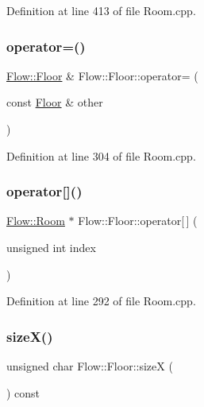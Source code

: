 Definition at line 413 of file Room.\+cpp.

\hypertarget{class_flow_1_1_floor_a0d053f735a848823fcb7e2f8650090da}{}\label{class_flow_1_1_floor_a0d053f735a848823fcb7e2f8650090da} 
\subsubsection{\texorpdfstring{operator=()}{operator=()}}
{\footnotesize\ttfamily \hyperlink{class_flow_1_1_floor}{Flow\+::\+Floor} \& Flow\+::\+Floor\+::operator= (\begin{DoxyParamCaption}\item[{const \hyperlink{class_flow_1_1_floor}{Floor} \&}]{other }\end{DoxyParamCaption})}



Definition at line 304 of file Room.\+cpp.

\hypertarget{class_flow_1_1_floor_a4b76afdb21d1687bd9ed0d37e09a15d7}{}\label{class_flow_1_1_floor_a4b76afdb21d1687bd9ed0d37e09a15d7} 
\subsubsection{\texorpdfstring{operator[]()}{operator[]()}}
{\footnotesize\ttfamily \hyperlink{class_flow_1_1_room}{Flow\+::\+Room} $\ast$ Flow\+::\+Floor\+::operator\mbox{[}$\,$\mbox{]} (\begin{DoxyParamCaption}\item[{unsigned int}]{index }\end{DoxyParamCaption})}



Definition at line 292 of file Room.\+cpp.

\hypertarget{class_flow_1_1_floor_ad56ae970e75d1be616164efd2f84125b}{}\label{class_flow_1_1_floor_ad56ae970e75d1be616164efd2f84125b} 
\subsubsection{\texorpdfstring{size\+X()}{sizeX()}}
{\footnotesize\ttfamily unsigned char Flow\+::\+Floor\+::sizeX (\begin{DoxyParamCaption}{ }\end{DoxyParamCaption}) const}



